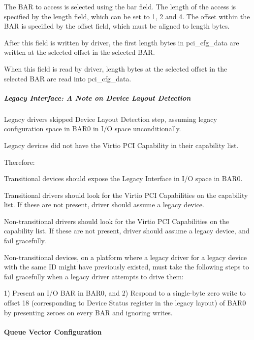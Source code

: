         The BAR to access is selected using the bar field.
        The length of the access is specified by the length
        field, which can be set to 1, 2 and 4.
        The offset within the BAR is specified by the offset
        field, which must be aligned to length bytes.

        After this field is written by driver, the first length
        bytes in pci_cfg_data are written at the selected
        offset in the selected BAR.

        When this field is read by driver, length bytes at the
        selected offset in the selected BAR are read into pci_cfg_data.

\subparagraph{Legacy Interface: A Note on Device Layout Detection}\label{sec:Virtio Transport Options / Virtio Over PCI Bus / PCI-specific Initialization And Device Operation / Device Initialization / Virtio Device Configuration Layout Detection / Legacy Interface: A Note on Device Layout Detection}

Legacy drivers skipped  Device Layout Detection step, assuming legacy
configuration space in BAR0 in I/O space unconditionally.

Legacy devices did not have the Virtio PCI Capability in their
capability list.

Therefore:

Transitional devices should expose the Legacy Interface in I/O
space in BAR0.

Transitional drivers should look for the Virtio PCI
Capabilities on the capability list.
If these are not present, driver should assume a legacy device.

Non-transitional drivers should look for the Virtio PCI
Capabilities on the capability list.
If these are not present, driver should assume a legacy device,
and fail gracefully.

Non-transitional devices, on a platform where a legacy driver for
a legacy device with the same ID might have previously existed,
must take the following steps to fail gracefully when a legacy
driver attempts to drive them:

1) Present an I/O BAR in BAR0, and
2) Respond to a single-byte zero write to offset 18
   (corresponding to Device Status register in the legacy layout)
   of BAR0 by presenting zeroes on every BAR and ignoring writes.

\paragraph{Queue Vector Configuration}\label{sec:Virtio Transport Options / Virtio Over PCI Bus / PCI-specific Initialization And Device Operation / Device Initialization / Queue Vector Configuration}

